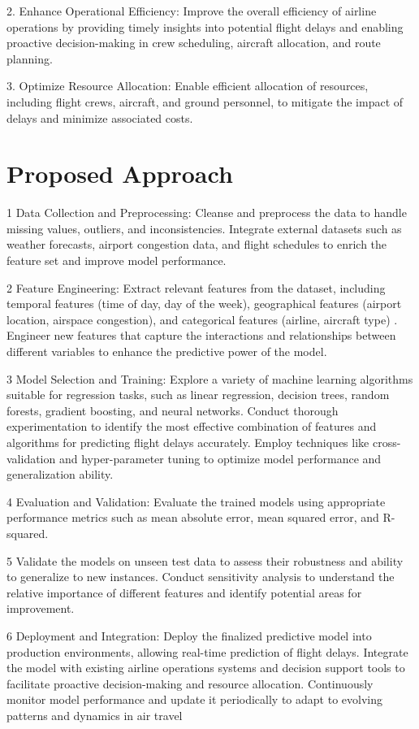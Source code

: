 \documentclass{article}
\begin{document}
2. Enhance Operational Efficiency: Improve the overall efficiency of airline operations by providing timely insights into potential flight delays and enabling proactive decision-making in crew scheduling, aircraft allocation, and route planning.

3. Optimize Resource Allocation: Enable efficient allocation of resources, including flight crews, aircraft, and ground personnel, to mitigate the impact of delays and minimize associated costs.

\section{Proposed Approach}
1 Data Collection and Preprocessing:
Cleanse and preprocess the data to handle missing values, outliers, and inconsistencies.
Integrate external datasets such as weather forecasts, airport congestion data, and flight schedules to enrich the feature set and improve model performance.

2 Feature Engineering:
Extract relevant features from the dataset, including temporal features (time of day, day of the week), geographical features (airport location, airspace congestion), and categorical features (airline, aircraft type) \cite{wang2022flight}.
Engineer new features that capture the interactions and relationships between different variables to enhance the predictive power of the model.

3 Model Selection and Training:
Explore a variety of machine learning algorithms suitable for regression tasks, such as linear regression, decision trees, random forests, gradient boosting, and neural networks.
Conduct thorough experimentation to identify the most effective combination of features and algorithms for predicting flight delays accurately.
Employ techniques like cross-validation and hyper-parameter tuning to optimize model performance and generalization ability.

4 Evaluation and Validation:
Evaluate the trained models using appropriate performance metrics such as mean absolute error, mean squared error, and R-squared.

5 Validate the models on unseen test data to assess their robustness and ability to generalize to new instances.
Conduct sensitivity analysis to understand the relative importance of different features and identify potential areas for improvement.

6 Deployment and Integration:
Deploy the finalized predictive model into production environments, allowing real-time prediction of flight delays.
Integrate the model with existing airline operations systems and decision support tools to facilitate proactive decision-making and resource allocation.
Continuously monitor model performance and update it periodically to adapt to evolving patterns and dynamics in air travel
\end{document}
